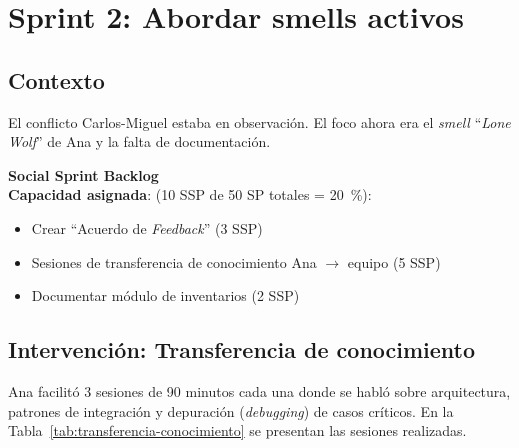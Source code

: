 \section{Sprint 2: Abordar smells activos}

\subsection{Contexto}

El conflicto Carlos-Miguel estaba en observación. El foco ahora era el \textit{smell} ``\textit{Lone Wolf}'' de Ana y la falta de documentación.

\textbf{Social Sprint Backlog}\mbox{}\\[-0.3\baselineskip]

\textbf{Capacidad asignada}: (10 SSP de 50 SP totales = 20~\%):
\begin{itemize}
    \item Crear ``Acuerdo de \textit{Feedback}'' (3 SSP)
    \item Sesiones de transferencia de conocimiento Ana $\rightarrow$ equipo (5 SSP)
    \item Documentar módulo de inventarios (2 SSP)
\end{itemize}

\subsection{Intervención: Transferencia de conocimiento}

Ana facilitó 3 sesiones de 90 minutos cada una donde se habló sobre arquitectura, patrones de integración y depuración (\textit{debugging}) de casos críticos. En la Tabla~\ref{tab:transferencia-conocimiento} se presentan las sesiones realizadas.

\begingroup
\scriptsize
\renewcommand{\arraystretch}{1.4}
\setlength{\tabcolsep}{4pt}
\setlength{\LTleft}{0pt}
\setlength{\LTright}{0pt}

